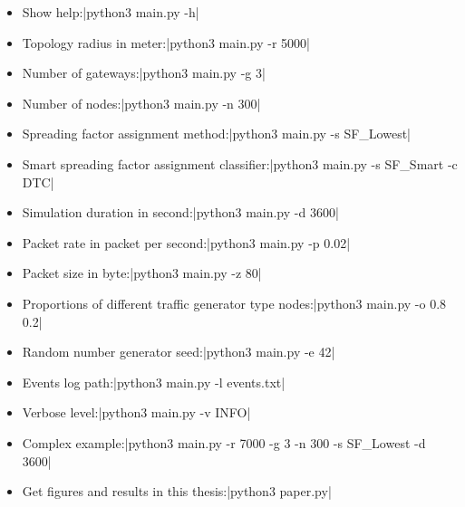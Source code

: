 \begin{itemize}
  \item Show help:|python3 main.py -h|
  \item Topology radius in meter:|python3 main.py -r 5000|
  \item Number of gateways:|python3 main.py -g 3|
  \item Number of nodes:|python3 main.py -n 300|
  \item Spreading factor assignment method:|python3 main.py -s SF_Lowest|
  \item Smart spreading factor assignment classifier:|python3 main.py -s SF_Smart -c DTC|
  \item Simulation duration in second:|python3 main.py -d 3600|
  \item Packet rate in packet per second:|python3 main.py -p 0.02|
  \item Packet size in byte:|python3 main.py -z 80|
  \item Proportions of different traffic generator type nodes:|python3 main.py -o 0.8 0.2|
  \item Random number generator seed:|python3 main.py -e 42|
  \item Events log path:|python3 main.py -l events.txt|
  \item Verbose level:|python3 main.py -v INFO|
  \item Complex example:|python3 main.py -r 7000 -g 3 -n 300 -s SF_Lowest -d 3600|
  \item Get figures and results in this thesis:|python3 paper.py|
\end{itemize}
